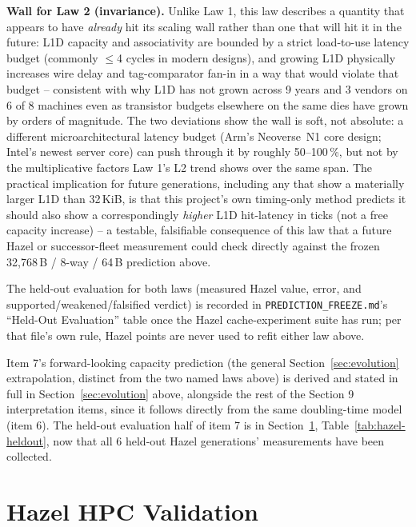\documentclass{article}
\begin{document}
\medskip

\noindent\textbf{Wall for Law 2 (invariance).} Unlike Law 1, this law describes a quantity that appears to have
\emph{already} hit its scaling wall rather than one that will hit it in the future: L1D capacity and
associativity are bounded by a strict load-to-use latency budget (commonly $\leq$4 cycles in modern
designs), and growing L1D physically increases wire delay and tag-comparator fan-in in a way that would
violate that budget -- consistent with why L1D has not grown across 9 years and 3 vendors on 6 of 8
machines even as transistor budgets elsewhere on the same dies have grown by orders of magnitude. The
two deviations show the wall is soft, not absolute: a different microarchitectural latency budget
(Arm's Neoverse~N1 core design; Intel's newest server core) can push through it by roughly
50--100\,\%, but not by the multiplicative factors Law 1's L2 trend shows over the same span. The
practical implication for future generations, including any that show a materially larger L1D than
32\,KiB, is that this project's own timing-only method predicts it should also show a
correspondingly \emph{higher} L1D hit-latency in ticks (not a free capacity increase) -- a testable,
falsifiable consequence of this law that a future Hazel or successor-fleet measurement could check
directly against the frozen 32,768\,B / 8-way / 64\,B prediction above.

The held-out evaluation for both laws (measured Hazel value, error, and supported/weakened/falsified
verdict) is recorded in \texttt{PREDICTION\_FREEZE.md}'s ``Held-Out Evaluation'' table once the Hazel
cache-experiment suite has run; per that file's own rule, Hazel points are never used to refit either
law above.

Item 7's forward-looking capacity prediction (the general Section~\ref{sec:evolution} extrapolation,
distinct from the two named laws above) is derived and stated in full in Section~\ref{sec:evolution}
above, alongside the rest of the Section 9 interpretation items, since it follows directly from the
same doubling-time model (item 6). The held-out evaluation half of item 7 is in
Section~\ref{sec:hazel}, Table~\ref{tab:hazel-heldout}, now that all 6 held-out Hazel
generations' measurements have been collected.

\section{Hazel HPC Validation}
\label{sec:hazel}
\end{document}
